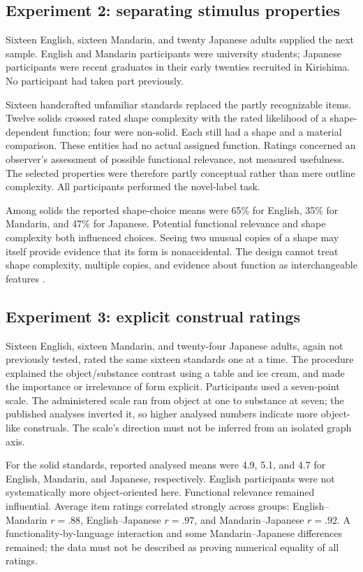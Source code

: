 \subsection{Experiment 2: separating stimulus properties}

Sixteen English, sixteen Mandarin, and twenty Japanese adults supplied
the next sample. English and Mandarin participants were university
students; Japanese participants were recent graduates in their early
twenties recruited in Kirishima. No participant had taken part previously.

Sixteen handcrafted unfamiliar standards replaced the partly recognizable
items. Twelve solids crossed rated shape complexity with the rated
likelihood of a shape-dependent function; four were non-solid.
Each still had a shape and a material comparison. These entities had no
actual assigned function. Ratings concerned an observer's assessment of
possible functional relevance, not measured usefulness. The selected
properties were therefore partly conceptual rather than mere outline
complexity. All participants performed the novel-label task.

Among solids the reported shape-choice means were 65\% for English,
35\% for Mandarin, and 47\% for Japanese. Potential functional relevance
and shape complexity both influenced choices. Seeing two unusual copies
of a shape may itself provide evidence that its form is nonaccidental.
The design cannot treat shape complexity, multiple copies, and evidence
about function as interchangeable features
\cite[pp.~496--501,Table~2,Fig.~2]{LiDunhamCarey2009SubstanceLC}.

\subsection{Experiment 3: explicit construal ratings}

Sixteen English, sixteen Mandarin, and twenty-four Japanese adults,
again not previously tested, rated the same sixteen standards one at a
time. The procedure explained the object/substance contrast using a table
and ice cream, and made the importance or irrelevance of form explicit.
Participants used a seven-point scale. The administered scale ran from
object at one to substance at seven; the published analyses inverted it,
so higher analysed numbers indicate more object-like construals.
The scale's direction must not be inferred from an isolated graph axis.

For the solid standards, reported analysed means were 4.9, 5.1, and 4.7
for English, Mandarin, and Japanese, respectively. English participants
were not systematically more object-oriented here. Functional relevance
remained influential. Average item ratings correlated strongly across
groups: English--Mandarin \(r=.88\), English--Japanese \(r=.97\), and
Mandarin--Japanese \(r=.92\). A functionality-by-language interaction
and some Mandarin--Japanese differences remained; the data must not be
described as proving numerical equality of all ratings.

